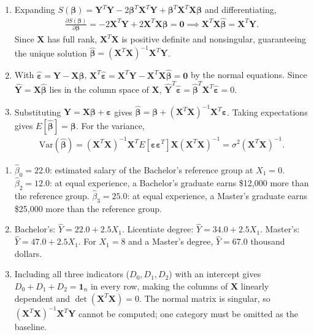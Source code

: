 \begin{solproblema}
\begin{enumerate}
\item Expanding $S(\boldsymbol\beta)=\mathbf Y^T\mathbf Y-2\boldsymbol\beta^T\mathbf X^T\mathbf Y+\boldsymbol\beta^T\mathbf X^T\mathbf X\boldsymbol\beta$ and differentiating,
\begin{align}
\frac{\partial S(\boldsymbol\beta)}{\partial\boldsymbol\beta}=-2\mathbf X^T\mathbf Y+2\mathbf X^T\mathbf X\boldsymbol\beta=\mathbf0\implies\mathbf X^T\mathbf X\hat{\boldsymbol\beta}=\mathbf X^T\mathbf Y.
\end{align}
Since $\mathbf X$ has full rank, $\mathbf X^T\mathbf X$ is positive definite and nonsingular, guaranteeing the unique solution $\hat{\boldsymbol\beta}=(\mathbf X^T\mathbf X)^{-1}\mathbf X^T\mathbf Y$.
\item With $\hat{\boldsymbol\varepsilon}=\mathbf Y-\mathbf X\hat{\boldsymbol\beta}$, $\mathbf X^T\hat{\boldsymbol\varepsilon}=\mathbf X^T\mathbf Y-\mathbf X^T\mathbf X\hat{\boldsymbol\beta}=\mathbf0$ by the normal equations. Since $\hat{\mathbf Y}=\mathbf X\hat{\boldsymbol\beta}$ lies in the column space of $\mathbf X$, $\hat{\mathbf Y}^T\hat{\boldsymbol\varepsilon}=\hat{\boldsymbol\beta}^T\mathbf X^T\hat{\boldsymbol\varepsilon}=0$.
\item Substituting $\mathbf Y=\mathbf X\boldsymbol\beta+\boldsymbol\varepsilon$ gives $\hat{\boldsymbol\beta}=\boldsymbol\beta+(\mathbf X^T\mathbf X)^{-1}\mathbf X^T\boldsymbol\varepsilon$. Taking expectations gives $E[\hat{\boldsymbol\beta}]=\boldsymbol\beta$. For the variance,
\begin{align}
\text{Var}(\hat{\boldsymbol\beta})=(\mathbf X^T\mathbf X)^{-1}\mathbf X^T E[\boldsymbol\varepsilon\boldsymbol\varepsilon^T]\mathbf X(\mathbf X^T\mathbf X)^{-1}=\sigma^2(\mathbf X^T\mathbf X)^{-1}.
\end{align}
\end{enumerate}
\end{solproblema}

\begin{solproblema}[prob:ee59291]
\begin{enumerate}
\item $\hat\beta_0=22.0$: estimated salary of the Bachelor's reference group at $X_1=0$. $\hat\beta_2=12.0$: at equal experience, a Bachelor's graduate earns \$12,000 more than the reference group. $\hat\beta_3=25.0$: at equal experience, a Master's graduate earns \$25,000 more than the reference group.
\item Bachelor's: $\hat Y=22.0+2.5X_1$. Licentiate degree: $\hat Y=34.0+2.5X_1$. Master's: $\hat Y=47.0+2.5X_1$. For $X_1=8$ and a Master's degree, $\hat Y=67.0$ thousand dollars.
\item Including all three indicators ($D_0,D_1,D_2$) with an intercept gives $D_0+D_1+D_2=\mathbf1_n$ in every row, making the columns of $\mathbf X$ linearly dependent and $\det(\mathbf X^T\mathbf X)=0$. The normal matrix is singular, so $(\mathbf X^T\mathbf X)^{-1}\mathbf X^T\mathbf Y$ cannot be computed; one category must be omitted as the baseline.
\end{enumerate}
\end{solproblema}


